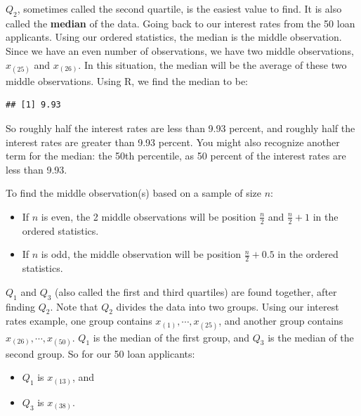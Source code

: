\documentclass[
]{book}
\newenvironment{Shaded}{\begin{snugshade}}{\end{snugshade}}
\newcommand{\FunctionTok}[1]{\textcolor[rgb]{0.13,0.29,0.53}{\textbf{#1}}}
\newcommand{\NormalTok}[1]{#1}
\newcommand{\SpecialCharTok}[1]{\textcolor[rgb]{0.81,0.36,0.00}{\textbf{#1}}}
\providecommand{\tightlist}{%
  \setlength{\itemsep}{0pt}\setlength{\parskip}{0pt}}
\begin{document}
\(Q_2\), sometimes called the second quartile, is the easiest value to find. It is also called the \textbf{median} of the data. Going back to our interest rates from the 50 loan applicants. Using our ordered statistics, the median is the middle observation. Since we have an even number of observations, we have two middle observations, \(x_{(25)}\) and \(x_{(26)}\). In this situation, the median will be the average of these two middle observations. Using R, we find the median to be:

\begin{Shaded}
\end{Shaded}

\begin{verbatim}
## [1] 9.93
\end{verbatim}

So roughly half the interest rates are less than 9.93 percent, and roughly half the interest rates are greater than 9.93 percent. You might also recognize another term for the median: the 50th percentile, as 50 percent of the interest rates are less than 9.93.

To find the middle observation(s) based on a sample of size \(n\):

\begin{itemize}
\tightlist
\item
  If \(n\) is even, the 2 middle observations will be position \(\frac{n}{2}\) and \(\frac{n}{2} + 1\) in the ordered statistics.
\item
  If \(n\) is odd, the middle observation will be position \(\frac{n}{2} + 0.5\) in the ordered statistics.
\end{itemize}

\(Q_1\) and \(Q_3\) (also called the first and third quartiles) are found together, after finding \(Q_2\). Note that \(Q_2\) divides the data into two groups. Using our interest rates example, one group contains \(x_{(1)}, \cdots, x_{(25)}\), and another group contains \(x_{(26)}, \cdots, x_{(50)}\). \(Q_1\) is the median of the first group, and \(Q_3\) is the median of the second group. So for our 50 loan applicants:

\begin{itemize}
\tightlist
\item
  \(Q_1\) is \(x_{(13)}\), and
\item
  \(Q_3\) is \(x_{(38)}\).
\end{itemize}
\end{document}
